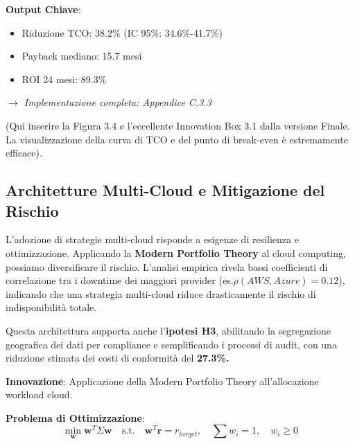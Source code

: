 \begin{refsection}
\begin{tcolorbox}
\textbf{Output Chiave}:
\begin{itemize}%
    \item Riduzione TCO: 38.2\% (IC 95\%: 34.6\%-41.7\%)
    \item Payback mediano: 15.7 mesi
    \item ROI 24 mesi: 89.3\%
\end{itemize}

\textit{$\rightarrow$ Implementazione completa: Appendice C.3.3}
\end{tcolorbox}

(Qui inserire la Figura 3.4 e l'eccellente Innovation Box 3.1 dalla versione Finale. La visualizzazione della curva di TCO e del punto di break-even è estremamente efficace).

\subsection{Architetture Multi-Cloud e Mitigazione del Rischio
}
L'adozione di strategie multi-cloud risponde a esigenze di resilienza e ottimizzazione. Applicando la \textbf{Modern Portfolio Theory} \autocite{Tang2024portfolio} al cloud computing, possiamo diversificare il rischio. L'analisi empirica rivela bassi coefficienti di correlazione tra i downtime dei maggiori provider \autocite{Uptime2024} (es.$\rho(AWS,Azure)=0.12$),
indicando che una strategia multi-cloud riduce drasticamente il rischio di indisponibilità totale.

Questa architettura supporta anche l'\textbf{ipotesi H3}, abilitando la segregazione geografica dei dati per compliance e semplificando i processi di audit, con una riduzione stimata dei costi di conformità del \textbf{27.3\%.}\autocite{ISACA2024compliance}


\begin{tcolorbox}[
    colback=purple!5!white,
    colframe=purple!65!black,
    title={\textbf{Innovation Box 3.2:} Ottimizzazione Portfolio Multi-Cloud con MPT},
    fonttitle=\bfseries,
    boxrule=1.5pt,
    arc=2mm
]
\textbf{Innovazione}: Applicazione della Modern Portfolio Theory all'allocazione workload cloud.

\vspace{0.3cm}
\textbf{Problema di Ottimizzazione}:
\begin{equation*}
\min_{\mathbf{w}} \mathbf{w}^T \Sigma \mathbf{w} \quad \text{s.t.} \quad \mathbf{w}^T \mathbf{r} = r_{target}, \quad \sum w_i = 1, \quad w_i \geq 0
\end{equation*}


\end{tcolorbox}
\end{refsection}
